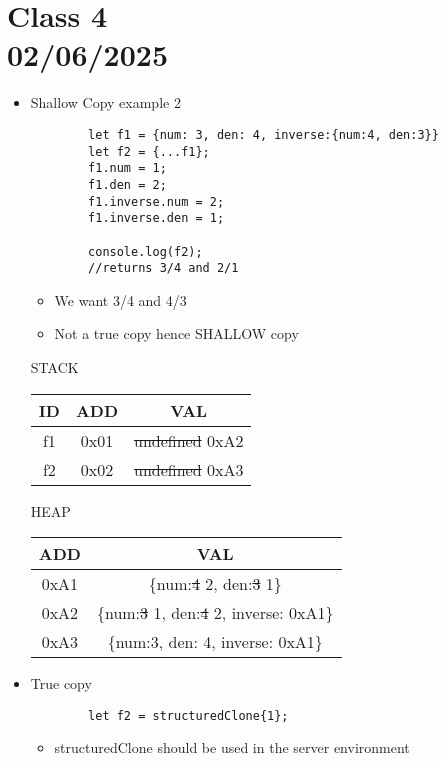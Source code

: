 \documentclass{article}
\begin{document}
\section*{Class 4 \\ 02/06/2025}\label{sec:Class 4}
\begin{itemize}
    \item Shallow Copy example 2
    \begin{lstlisting}
        let f1 = {num: 3, den: 4, inverse:{num:4, den:3}}
        let f2 = {...f1};
        f1.num = 1;
        f1.den = 2;
        f1.inverse.num = 2;
        f1.inverse.den = 1;
        
        console.log(f2);
        //returns 3/4 and 2/1
    \end{lstlisting}
    \begin{itemize}
        \item We want 3/4 and 4/3
        \item Not a true copy hence SHALLOW copy
    \end{itemize}
    \begin{center}
        STACK
        \begin{tabular}{|c|c|c|} \hline ID & ADD & VAL \\
            \hline\hline 
            f1 & 0x01 & \st{undefined} 0xA2 \\
            f2 & 0x02 & \st{undefined} 0xA3  \\
            \hline
        \end{tabular}
    \end{center}
    \begin{center}
        HEAP
        \begin{tabular}{|c|c|}
            \hline ADD & VAL \\
            \hline\hline
            0xA1 & \{num:\st{4} 2, den:\st{3} 1\} \\
            0xA2 & \{num:\st{3} 1, den:\st{4} 2, inverse: 0xA1\} \\
            0xA3 & \{num:3, den: 4, inverse: 0xA1\} \\
            \hline
        \end{tabular}
    \end{center}
    \item True copy
    \begin{lstlisting}
        let f2 = structuredClone{1};
    \end{lstlisting}
    \begin{itemize}
        \item structuredClone should be used in the server environment

\end{itemize}
\end{itemize}
\end{document}
